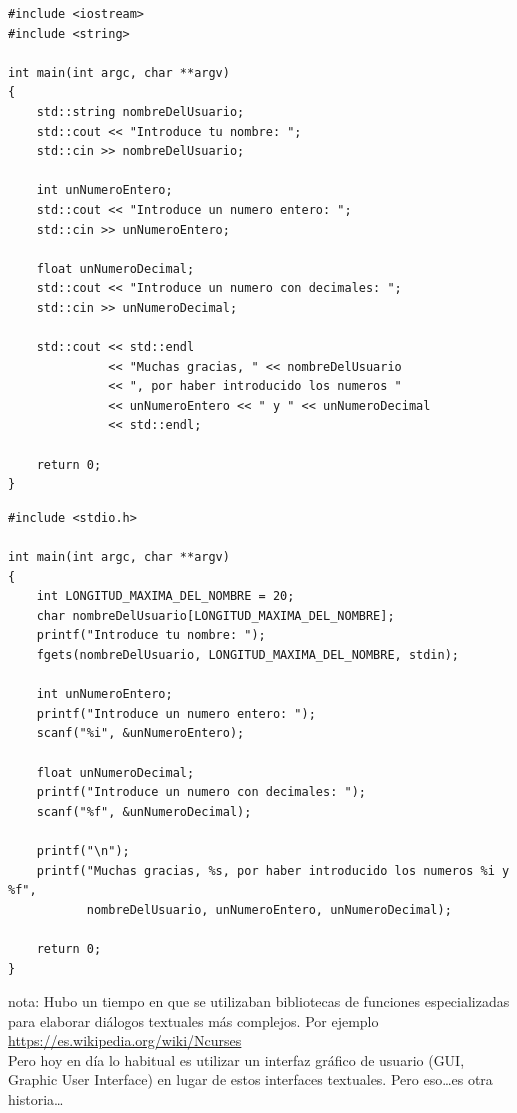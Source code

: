\documentclass[spanish,12pt,a4paper,final,oneside]{book}
\begin{document}
\begin{lstlisting}[frame=single, caption=lenguaje C++]
#include <iostream>
#include <string>

int main(int argc, char **argv)
{
    std::string nombreDelUsuario;
    std::cout << "Introduce tu nombre: ";
    std::cin >> nombreDelUsuario;

    int unNumeroEntero;
    std::cout << "Introduce un numero entero: ";
    std::cin >> unNumeroEntero;

    float unNumeroDecimal;
    std::cout << "Introduce un numero con decimales: ";
    std::cin >> unNumeroDecimal;

    std::cout << std::endl
              << "Muchas gracias, " << nombreDelUsuario
              << ", por haber introducido los numeros " 
              << unNumeroEntero << " y " << unNumeroDecimal
              << std::endl;

    return 0;
}
\end{lstlisting}



\begin{lstlisting}[frame=single, caption=lenguaje C]
#include <stdio.h>

int main(int argc, char **argv)
{
    int LONGITUD_MAXIMA_DEL_NOMBRE = 20;
    char nombreDelUsuario[LONGITUD_MAXIMA_DEL_NOMBRE];
    printf("Introduce tu nombre: ");
    fgets(nombreDelUsuario, LONGITUD_MAXIMA_DEL_NOMBRE, stdin);

    int unNumeroEntero;
    printf("Introduce un numero entero: ");
    scanf("%i", &unNumeroEntero);

    float unNumeroDecimal;
    printf("Introduce un numero con decimales: ");
    scanf("%f", &unNumeroDecimal);

    printf("\n");
    printf("Muchas gracias, %s, por haber introducido los numeros %i y %f",
           nombreDelUsuario, unNumeroEntero, unNumeroDecimal);
	
    return 0;
}

\end{lstlisting}


nota: Hubo un tiempo en que se utilizaban bibliotecas de funciones especializadas para elaborar diálogos textuales más complejos. Por ejemplo \url{https://es.wikipedia.org/wiki/Ncurses}
\\Pero hoy en día lo habitual es utilizar un interfaz gráfico de usuario (GUI, Graphic User Interface) en lugar de estos interfaces textuales. Pero eso\ldots es otra historia\ldots
\end{document}
